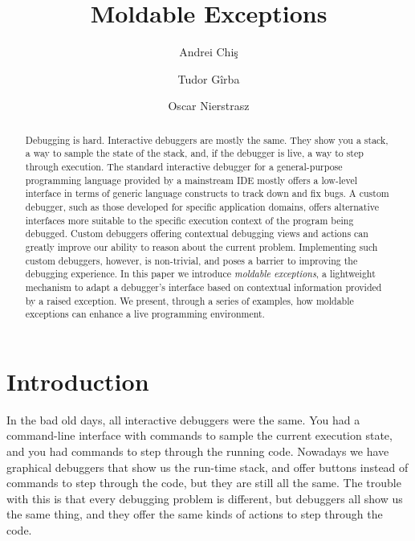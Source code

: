 \documentclass[sigplan,anonymous,review,10pt]{acmart}
\begin{document}
\title{Moldable Exceptions}
\author{Andrei Chi\c{s}}
\author{Tudor G\^irba}
\author{Oscar Nierstrasz}

\renewcommand{\shortauthors}{Chi\c{s} et al.}

\begin{abstract}
Debugging is hard.
Interactive debuggers are mostly the same.
They show you a stack, a way to sample the state of the stack, and, if the debugger is live, a way to step through execution.
The standard interactive debugger for a general-purpose programming language provided by a mainstream IDE mostly offers a low-level interface in terms of generic language constructs to track down and fix bugs.
A custom debugger, such as those developed for specific application domains, offers alternative interfaces more suitable to the specific execution context of the program being debugged.
Custom debuggers offering contextual debugging views and actions can greatly improve our ability to reason about the current problem.
Implementing such custom debuggers, however, is non-trivial, and poses a barrier to improving the debugging experience.
In this paper we introduce \emph{moldable exceptions}, a lightweight mechanism to adapt a debugger's interface based on contextual information provided by a raised exception.
We present, through a series of examples, how moldable exceptions can enhance a live programming environment.
\end{abstract}



\maketitle

\section{Introduction}\label{sec:intro}

In the bad old days, all interactive debuggers were the same.
You had a command-line interface with commands to sample the current execution state, and you had commands to step through the running code.
Nowadays we have graphical debuggers that show us the run-time stack, and offer buttons instead of commands to step through the code, but they are still all the same.
The trouble with this is that every debugging problem is different, but debuggers all show us the same thing, and they offer the same kinds of actions to step through the code.
\end{document}
